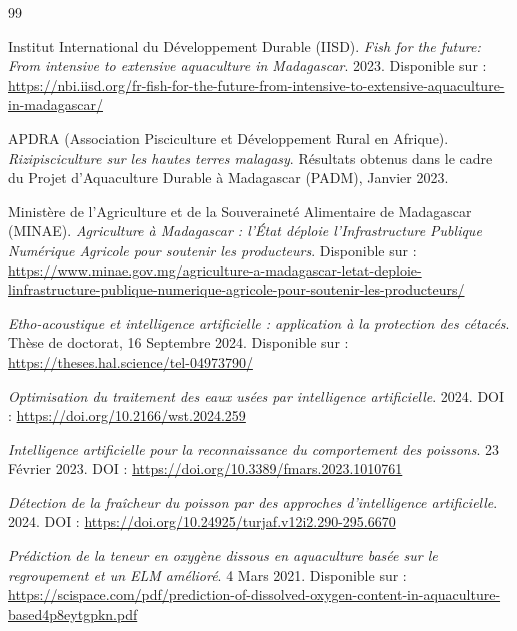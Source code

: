 \documentclass[a4paper,12pt, oneside]{article}
\begin{document}
\vspace*{\fill}
\newpage
{}
\onehalfspacing
\renewcommand{\refname}{\hfil BIBLIOGRAPHIE \hfil}
\begin{thebibliography}{99}

Institut International du Développement Durable (IISD).
\newline \textit{Fish for the future: From intensive to extensive aquaculture in Madagascar}. 2023. Disponible sur : \url{https://nbi.iisd.org/fr-fish-for-the-future-from-intensive-to-extensive-aquaculture-in-madagascar/}

APDRA (Association Pisciculture et Développement Rural en Afrique).
\newline \textit{Rizipisciculture sur les hautes terres malagasy}. Résultats obtenus dans le cadre du Projet d'Aquaculture Durable à Madagascar (PADM), Janvier 2023.

Ministère de l'Agriculture et de la Souveraineté Alimentaire de Madagascar (MINAE).
\newline \textit{Agriculture à Madagascar : l'État déploie l'Infrastructure Publique Numérique Agricole pour soutenir les producteurs}. Disponible sur : \url{https://www.minae.gov.mg/agriculture-a-madagascar-letat-deploie-linfrastructure-publique-numerique-agricole-pour-soutenir-les-producteurs/}

\textit{Etho-acoustique et intelligence artificielle : application à la protection des cétacés}. Thèse de doctorat, 16 Septembre 2024. Disponible sur : \url{https://theses.hal.science/tel-04973790/}

\textit{Optimisation du traitement des eaux usées par intelligence artificielle}. 2024. DOI : \url{https://doi.org/10.2166/wst.2024.259}

\textit{Intelligence artificielle pour la reconnaissance du comportement des poissons}. 23 Février 2023. DOI : \url{https://doi.org/10.3389/fmars.2023.1010761}

\textit{Détection de la fraîcheur du poisson par des approches d'intelligence artificielle}. 2024. DOI : \url{https://doi.org/10.24925/turjaf.v12i2.290-295.6670}

\textit{Prédiction de la teneur en oxygène dissous en aquaculture basée sur le regroupement et un ELM amélioré}. 4 Mars 2021. Disponible sur : \url{https://scispace.com/pdf/prediction-of-dissolved-oxygen-content-in-aquaculture-based4p8eytgpkn.pdf}


\end{thebibliography}
\end{document}
